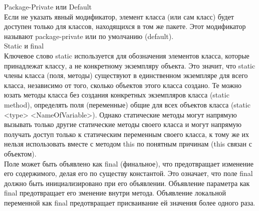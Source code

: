Package-Private или Default \\
Если не указать явный модификатор, элемент класса (или сам класс) будет доступен только для классов, находящихся в том же пакете. Этот модификатор называют package-private или по умолчанию (default). \\
Static и final \\
Ключевое слово static используется для обозначения элементов класса, которые принадлежат классу, а не конкретному экземпляру объекта. Это значит, что static члены класса (поля, методы) существуют в единственном экземпляре для всего класса, независимо от того, сколько объектов этого класса создано. Те можно юзать методы класса без создания конкретных экземпляров класса (static method), определять поля (переменные) общие для всех объектов класса (static <type> <NameOfVariable>). Однако статические методы могут напрямую вызывать только другие статические методы своего класса и могут напрямую получать доступ только к статическим переменным своего класса, к тому же их нельзя использовать вместе с методом this по понятным причинам (this связан с объектом). \\
Поле может быть объявлено как final (финальное), что предотвращает изменение его содержимого, делая его по существу константой. Это означает, что поле final должно быть инициализировано при его объявлении. Объявление параметра как final предотвращает его зменение внутри метода. Объявление локальной переменной как final предотвращает присваивание ей значения более одного раза. 


